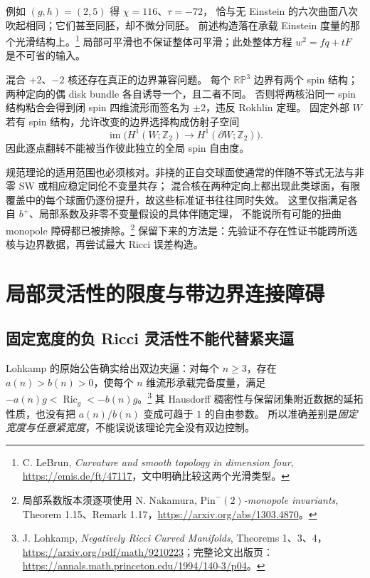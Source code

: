 \documentclass[UTF8,fontset=fandol,zihao=-4,oneside,openany]{ctexbook}
\theoremstyle{cjkplain}
\numberwithin{equation}{chapter}
\DeclareMathOperator{\Ric}{Ric}
\begin{document}
例如 \((g,h)=(2,5)\) 得 \(\chi=116\)、\(\tau=-72\)，
恰与无 Einstein 的六次曲面八次吹起相同；它们甚至同胚，却不微分同胚。
前述构造落在承载 Einstein 度量的那个光滑结构上。\footnote{C. LeBrun, \emph{Curvature and smooth topology in dimension four}, \url{https://emis.de/ft/47117}，文中明确比较这两个光滑类型。}
局部可平滑也不保证整体可平滑；此处整体方程 \(w^2=fq+tF\) 是不可省的输入。

混合 \(+2\)、\(-2\) 核还存在真正的边界兼容问题。
每个 \(\mathbb{RP}^3\) 边界有两个 spin 结构；两种定向的偶 disk bundle 各自诱导一个，且二者不同。
否则将两核沿同一 spin 结构粘合会得到闭 spin 四维流形而签名为 \(\pm2\)，违反 Rokhlin 定理。
固定外部 \(W\) 若有 spin 结构，允许改变的边界选择构成仿射子空间
\[
\operatorname{im}\bigl(H^1(W;\mathbb Z_2)\longrightarrow
H^1(\partial W;\mathbb Z_2)\bigr).
\]
因此逐点翻转不能被当作彼此独立的全局 spin 自由度。

规范理论的适用范围也必须核对。非挠的正自交球面使通常的伴随不等式无法与非零 SW 或相应稳定同伦不变量共存；
混合核在两种定向上都出现此类球面，有限覆盖中的每个球面仍逐份提升，故这些标准证书往往同时失效。
这里仅指满足各自 \(b^+\)、局部系数及非零不变量假设的具体伴随定理，
不能说所有可能的扭曲 monopole 障碍都已被排除。\footnote{局部系数版本须逐项使用 N. Nakamura, \emph{\(\mathrm{Pin}^-(2)\)-monopole invariants}, Theorem 1.15、Remark 1.17，\url{https://arxiv.org/abs/1303.4870}。}
保留下来的方法是：先验证不存在性证书能跨所选核与边界数据，再尝试最大 Ricci 误差构造。

\chapter{局部灵活性的限度与带边界连接障碍}
\label{FND:neckchapter}

\section{固定宽度的负 Ricci 灵活性不能代替紧夹逼}
\label{FND:lohkamp}

Lohkamp 的原始公告确实给出双边夹逼：对每个 \(n\ge3\)，存在
\(a(n)>b(n)>0\)，使每个 \(n\) 维流形承载完备度量，满足
\(-a(n)g<\Ric_g<-b(n)g\)。\footnote{J. Lohkamp, \emph{Negatively Ricci Curved Manifolds}, Theorems 1、3、4，\url{https://arxiv.org/pdf/math/9210223}；完整论文出版页：\url{https://annals.math.princeton.edu/1994/140-3/p04}。}
其 Hausdorff 稠密性与保留闭集附近数据的延拓性质，也没有把 \(a(n)/b(n)\) 变成可趋于 \(1\) 的自由参数。
所以准确差别是\emph{固定宽度与任意紧宽度}，不能误说该理论完全没有双边控制。
\end{document}
